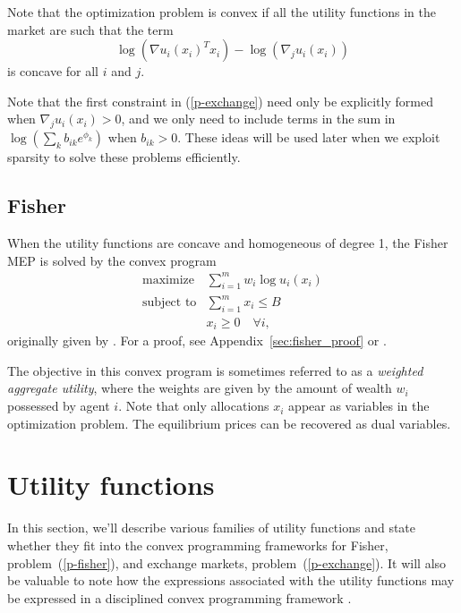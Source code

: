 \documentclass[12pt]{article}
\begin{document}
Note that the optimization problem is convex if all the utility functions
in the market are such that the term
\begin{equation}
\label{e-util-constraint}
\log(\nabla u_i(x_i)^T x_i) - \log(\nabla_j u_i(x_i))
\end{equation}
is concave for all $i$ and $j$.

Note that the first constraint in (\ref{p-exchange}) need only be explicitly formed when
$\nabla_j u_i(x_i) > 0$, and we only need to include terms in the sum in
$\log(\sum_k b_{ik} e^{\phi_k})$ when $b_{ik} > 0$.
These ideas will be used later when we exploit sparsity to solve these
problems efficiently.

\subsection{Fisher}
\label{sec:convex_form_fisher}

When the utility functions are concave and homogeneous of degree 1,
the Fisher MEP is solved by the convex program
\begin{equation}
\label{p-fisher}
\begin{array}{ll}
\mbox{maximize} & \sum_{i=1}^m w_i \log u_i(x_i) \\
\mbox{subject to} & \sum_{i=1}^m x_i \leq B\\
& x_i \geq 0\quad \forall i,
\end{array}
\end{equation}
originally given by \cite{eisenberg1959consensus, gale1960theory, eisenberg1961aggregation}.
For a proof, see Appendix~\ref{sec:fisher_proof} or \cite[\S~6.2]{nisan2007algorithmic}.

The objective in this convex program is sometimes referred to as a \emph{weighted aggregate utility}, where the weights are given by the amount
of wealth $w_i$ possessed by agent $i$.
Note that only allocations $x_i$ appear as variables in the optimization
problem.
The equilibrium prices can be recovered as dual variables.

\section{Utility functions}
\label{sec:util_funcs}

In this section, we'll describe various families of utility functions
and state whether they fit into the convex programming frameworks
for Fisher, problem~(\ref{p-fisher}), and exchange markets, problem~(\ref{p-exchange}). 
It will also
be valuable to note how the expressions associated
with the utility functions may be expressed in a disciplined
convex programming framework \cite{grant2006disciplined}.
\end{document}
